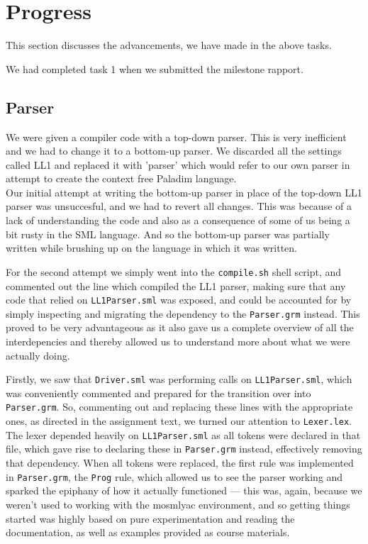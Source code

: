 \documentclass[11pt]{article}
\begin{document}
\section*{Progress}
This section discusses the advancements, we have made in the above tasks.

We had completed task 1 when we submitted the milestone rapport.

\subsection*{Parser}
We were given a compiler code with a top-down parser. This is very inefficient and we had to change it to a bottom-up parser. We discarded all the settings called LL1 and replaced it with 'parser' which would refer to our own parser in attempt to create the context free Paladim language.
\\
Our initial attempt at writing the bottom-up parser in place of the top-down LL1 parser was unsuccesful, and we had to revert all changes. This was because of a lack of understanding the code and also as a consequence of some of us being a bit rusty in the SML language. And so the bottom-up parser was partially written while brushing up on the language in which it was written.

For the second attempt we simply went into the {\tt compile.sh} shell script, and commented out the line which compiled the LL1 parser, making sure that any code that relied on {\tt LL1Parser.sml} was exposed, and could be accounted for by simply inspecting and migrating the dependency to the {\tt Parser.grm} instead. This proved to be very advantageous as it also gave us a complete overview of all the interdepencies and thereby allowed us to understand more about what we were actually doing.

Firstly, we saw that {\tt Driver.sml} was performing calls on {\tt LL1Parser.sml}, which was conveniently commented and prepared for the transition over into {\tt Parser.grm}. So, commenting out and replacing these lines with the appropriate ones, as directed in the assignment text, we turned our attention to {\tt Lexer.lex}. The lexer depended heavily on {\tt LL1Parser.sml} as all tokens were declared in that file, which gave rise to declaring these in {\tt Parser.grm} instead, effectively removing that dependency. When all tokens were replaced, the first rule was implemented in {\tt Parser.grm}, the {\tt Prog} rule, which allowed us to see the parser working and sparked the epiphany of how it actually functioned --- this was, again, because we weren't used to working with the mosmlyac environment, and so getting things started was highly based on pure experimentation and reading the documentation, as well as examples provided as course materials.
\end{document}
